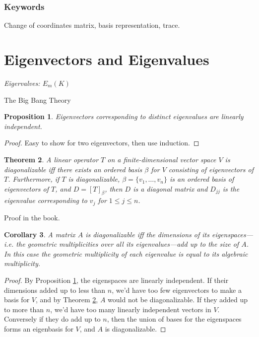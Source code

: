 \documentclass[12pt]{article}
\theoremstyle{plain}
\newtheorem{theorem}{Theorem}
\newtheorem{corollary}[theorem]{Corollary}
\newtheorem{proposition}[theorem]{Proposition}
\theoremstyle{definition}
\theoremstyle{remark}
\begin{document}
\section*{Keywords}

Change of coordinates matrix, basis representation, trace.

\part{Eigenvectors and Eigenvalues}

\epigraph{\textit{Eigervalves: $E_m(K)$}}{The Big Bang Theory}

\begin{proposition}\label{eigenindependence}
Eigenvectors corresponding to distinct eigenvalues are linearly independent.
\end{proposition}

\begin{proof}
Easy to show for two eigenvectors, then use induction.
\end{proof}

\begin{theorem}\label{diagonalizable}
A linear operator $T$ on a finite-dimensional vector space $V$ is diagonalizable iff there exists an ordered basis $\beta$ for $V$ consisting of eigenvectors of $T$. Furthermore, if $T$ is diagonalizable, $\beta = \{v_1,\ldots, v_n\}$ is an ordered basis of eigenvectors of $T$, and $D = [T]_\beta$, then $D$ is a diagonal matrix and $D_{jj}$ is the eigenvalue corresponding to $v_j$ for $1 \leq j \leq n$.
\end{theorem}

Proof in the book.

\begin{corollary}
A matrix $A$ is diagonalizable iff the dimensions of its eigenspaces---i.e. the geometric multiplicities over all its eigenvalues---add up to the size of $A$. In this case the geometric multiplicity of each eigenvalue is equal to its algebraic multiplicity.
\end{corollary}

\begin{proof}
By Proposition \ref{eigenindependence}, the eigenspaces are linearly independent. If their dimensions added up to less than $n$, we'd have too few eigenvectors to make a basis for $V$, and by Theorem \ref{diagonalizable}, $A$ would not be diagonalizable. If they added up to more than $n$, we'd have too many linearly independent vectors in $V$. Conversely if they do add up to $n$, then the union of bases for the eigenspaces forms an eigenbasis for $V$, and $A$ is diagonalizable. 
\end{proof}
\end{document}
